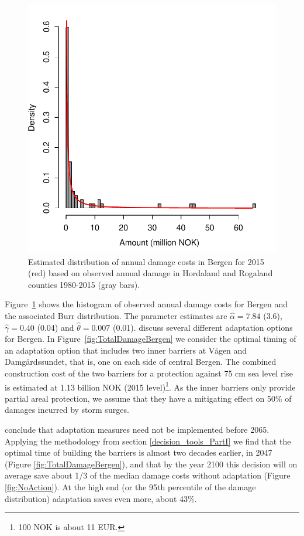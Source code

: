 \documentclass[note,screen,british,11pt]{nrdoc}
\begin{document}
\begin{figure}[!hbpt]
\begin{center}
\includegraphics[width=0.5\linewidth]{DecisionAnalysisBergenPartI.pdf}
\caption{Estimated distribution of annual damage costs in Bergen for 2015 (red) based on observed annual damage in Hordaland and Rogaland counties 1980-2015 (gray bars).}
\label{fig:BergenDamageDist}
\end{center}
\end{figure}

Figure~\ref{fig:BergenDamageDist} shows the histogram of observed annual damage costs for Bergen and the associated Burr distribution. The parameter estimates are $\hat{\alpha} = 7.84$ (3.6), $\hat{\gamma} = 0.40$ (0.04) and $\hat{\theta} = 0.007$ (0.01). \citet{bergenreport} discuss several different adaptation options for Bergen. In Figure~\ref{fig:TotalDamageBergen} we consider the optimal timing of an adaptation option that includes two inner barriers at V{\aa}gen and Damg{\aa}rdssundet, that is, one on each side of central Bergen. The combined construction cost of the two barriers for a protection against 75 cm sea level rise is estimated at 1.13 billion NOK (2015 level)\footnote{100 NOK is about 11 EUR.}. As the inner barriers only provide partial areal protection, we assume that they have a mitigating effect on 50\% of damages incurred by storm surges. 

\citet{bergenreport} conclude that adaptation measures need not be implemented before 2065. Applying the methodology from section \ref{decision_tools_PartI} we find that the optimal time of building the barriers is almost two decades earlier, in 2047 (Figure \ref{fig:TotalDamageBergen}), and that by the year 2100 this decision will on average save about 1/3 of the median damage costs without adaptation (Figure \ref{fig:NoAction}). At the high end (or the 95th percentile of the damage distribution) adaptation saves even more, about 43\%.  
\end{document}
